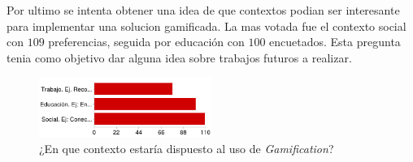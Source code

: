 Por ultimo se intenta obtener una idea de que contextos podian ser interesante para implementar una
solucion gamificada. La mas votada fue el contexto social con $109$ preferencias, seguida por educación con
$100$ encuetados. Esta pregunta tenia como objetivo dar alguna idea sobre trabajos futuros a realizar.

\begin{figure}[!htb]
  \centering
  \includegraphics[width=0.5\textwidth]{images/chartPreg11.png}
  \caption[chart11]{¿En que contexto estaría dispuesto al uso de \emph{Gamification}?}
  \label{fig:chart2}
\end{figure}
